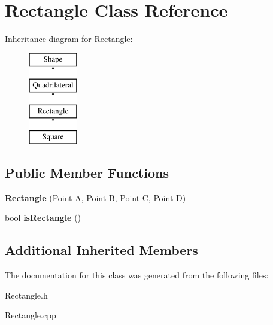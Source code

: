 \hypertarget{class_rectangle}{}\section{Rectangle Class Reference}
\label{class_rectangle}
Inheritance diagram for Rectangle\+:\begin{figure}[H]
\begin{center}
\leavevmode
\includegraphics[height=4.000000cm]{class_rectangle}
\end{center}
\end{figure}
\subsection*{Public Member Functions}
\begin{DoxyCompactItemize}
\item 
\mbox{\label{class_rectangle_a7c887b9c998a47ca2e1c93c9c4a3a451}} 
{\bfseries Rectangle} (\mbox{\hyperlink{class_point}{Point}} A, \mbox{\hyperlink{class_point}{Point}} B, \mbox{\hyperlink{class_point}{Point}} C, \mbox{\hyperlink{class_point}{Point}} D)
\item 
\mbox{\label{class_rectangle_a01405cb4bc1cef7c60e16f991b12269b}} 
bool {\bfseries is\+Rectangle} ()
\end{DoxyCompactItemize}
\subsection*{Additional Inherited Members}


The documentation for this class was generated from the following files\+:\begin{DoxyCompactItemize}
\item 
Rectangle.\+h\item 
Rectangle.\+cpp\end{DoxyCompactItemize}
